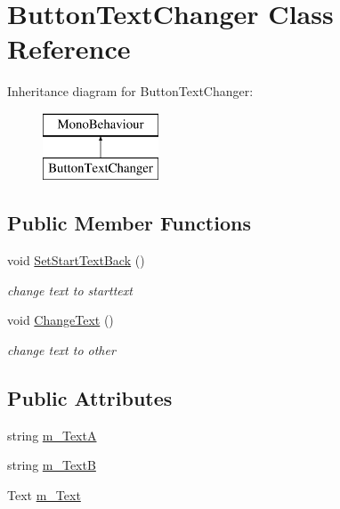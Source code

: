 \hypertarget{class_button_text_changer}{}\section{Button\+Text\+Changer Class Reference}
\label{class_button_text_changer}
Inheritance diagram for Button\+Text\+Changer\+:\begin{figure}[H]
\begin{center}
\leavevmode
\includegraphics[height=2.000000cm]{class_button_text_changer}
\end{center}
\end{figure}
\subsection*{Public Member Functions}
\begin{DoxyCompactItemize}
\item 
void \mbox{\hyperlink{class_button_text_changer_abf152286d21937f8e274911123ce42e9}{Set\+Start\+Text\+Back}} ()
\begin{DoxyCompactList}\small\item\em change text to starttext \end{DoxyCompactList}\item 
void \mbox{\hyperlink{class_button_text_changer_a4142650e1f21cd495a27b0427d612149}{Change\+Text}} ()
\begin{DoxyCompactList}\small\item\em change text to other \end{DoxyCompactList}\end{DoxyCompactItemize}
\subsection*{Public Attributes}
\begin{DoxyCompactItemize}
\item 
string \mbox{\hyperlink{class_button_text_changer_a46a20f954ddd4a0abf3864130b64f7c7}{m\+\_\+\+TextA}}
\item 
string \mbox{\hyperlink{class_button_text_changer_a1a572f482973aea0d220f36f0084352f}{m\+\_\+\+TextB}}
\item 
Text \mbox{\hyperlink{class_button_text_changer_ab23d962cea0c1eaf87b78f0728fff33c}{m\+\_\+\+Text}}
\end{DoxyCompactItemize}


